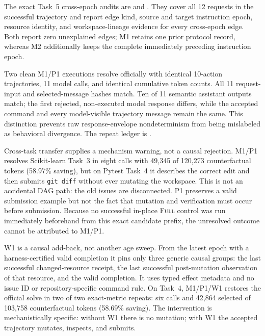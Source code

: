 \documentclass[11pt]{article}
\begin{document}
The exact Task~5 cross-epoch audits are
 and
.  They cover all 12
requests in the successful trajectory and report edge kind, source and target
instruction epoch, resource identity, and workspace-lineage evidence for every
cross-epoch edge.  Both report zero unexplained edges; M1 retains one prior
protocol record, whereas M2 additionally keeps the complete immediately
preceding instruction epoch.

Two clean M1/P1 executions resolve officially with identical 10-action
trajectories, 11 model calls, and identical cumulative token counts.  All 11
request-input and selected-message hashes match.  Ten of 11 semantic assistant
outputs match; the first rejected, non-executed model response differs, while
the accepted command and every model-visible trajectory message remain the
same.  This distinction prevents raw response-envelope nondeterminism from
being mislabeled as behavioral divergence.  The repeat ledger is
.

Cross-task transfer supplies a mechanism warning, not a causal rejection.
M1/P1 resolves
Scikit-learn Task~3 in eight calls with 49,345 of 120,273 counterfactual tokens
(58.97\% saving), but on Pytest Task~4 it describes the correct edit and then
submits \texttt{git diff} without ever mutating the workspace.  This is not an
accidental DAG path: the old issues are disconnected.  P1 preserves a valid
submission example but not the fact that mutation and verification must occur
before submission.  Because no successful in-place \textsc{Full} control was
run immediately beforehand from this exact candidate prefix, the unresolved
outcome cannot be attributed to M1/P1.

W1 is a causal add-back, not another age sweep.  From the latest epoch with a
harness-certified valid completion it pins only three generic causal groups:
the last successful changed-resource receipt, the last successful
post-mutation observation of that resource, and the valid completion.  It uses
typed effect metadata and no issue ID or repository-specific command rule.
On Task~4, M1/P1/W1 restores the official solve in two of two exact-metric
repeats: six calls and 42,864 selected of 103,758 counterfactual tokens
(58.69\% saving).  The intervention is mechanistically specific: without W1
there is no mutation; with W1 the accepted trajectory mutates, inspects, and
submits.
\end{document}

